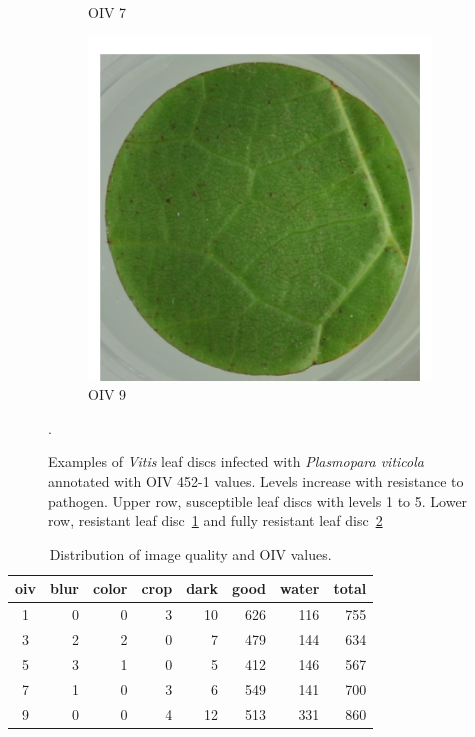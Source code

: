 \documentclass[english]{article}
\begin{document}
\begin{figure}[H]
\begin{subfigure}[b]{0.3\linewidth}
        \caption{OIV 7}\label{fig:oiv7}
    \end{subfigure}
    \begin{subfigure}[b]{0.3\linewidth}
        \includegraphics[width=\linewidth]{oiv9.png}
        \caption{OIV 9}\label{fig:oiv9}
    \end{subfigure}
    \caption{Examples of \textit{Vitis} leaf discs infected with \textit{Plasmopara viticola} annotated with OIV 452-1 values. Levels increase with resistance to pathogen. Upper row, susceptible leaf discs with levels 1 to 5. Lower row, resistant leaf disc~\ref{fig:oiv7} and fully resistant leaf disc~\ref{fig:oiv9}}\label{fig:oivlevels}. 
\end{figure}

\begin{table}[H]
    \centering
    \caption{Distribution of image quality and OIV values.}
    \label{tab:dataoivcount}
    \begin{tabular}{c|rrrrrrr}
        \toprule
        oiv & blur & color & crop & dark & good & water & total \\
        \midrule
        1   & 0    & 0     & 3    & 10   & 626  & 116   & 755   \\
        3   & 2    & 2     & 0    & 7    & 479  & 144   & 634   \\
        5   & 3    & 1     & 0    & 5    & 412  & 146   & 567   \\
        7   & 1    & 0     & 3    & 6    & 549  & 141   & 700   \\
        9   & 0    & 0     & 4    & 12   & 513  & 331   & 860   \\
        \bottomrule
    \end{tabular}
\end{table}
\end{document}
